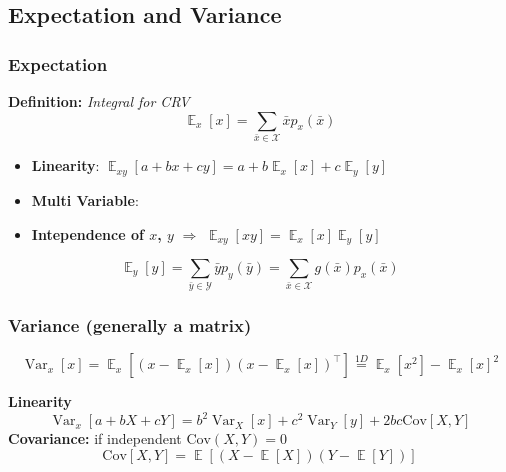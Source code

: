 \subsection{Expectation and Variance}
    \subsubsection{Expectation}
    \textbf{Definition:} \textit{Integral for CRV}
    \begin{equation*}
        \textstyle\mathop{\mathbb{E}}_{x}[x] = \textstyle\sum_{\bar{x} \in \mathcal{X}} \bar{x} p_{x}(\bar{x})
    \end{equation*}
    \begin{itemize}[left=0pt]
        \item \textbf{Linearity}: $\textstyle\mathop{\mathbb{E}}_{xy}[a + bx + cy] = a + b\mathop{\mathbb{E}}_{x}[x] + c\mathop{\mathbb{E}}_{y}[y]$
        \item \textbf{Multi Variable}: 
        \item \textbf{Intependence of $x$, $y$} $\Rightarrow$ $\mathop{\mathbb{E}}_{xy} \left[ xy \right] = \mathop{\mathbb{E}}_{x} \left[ x \right] \mathop{\mathbb{E}}_{y} \left[ y \right]$
    \end{itemize}

    \begin{equation*}
        \textstyle\mathop{\mathbb{E}}_y \left[ y \right]
        = \sum_{\bar{y}\in\mathcal{Y}} \bar{y} p_y (\bar{y})
        = \sum_{\bar{x}\in\mathcal{X}} g(\bar{x})p_x(\bar{x})
    \end{equation*}

    \subsubsection{Variance (generally a matrix)} 
    \begin{equation*}
        \mathop{\mathrm{Var}}_{x}[x] = \mathop{\mathbb{E}}_{x} \left[
        (x \!-\! \textstyle\mathop{\mathbb{E}}_{x}[x])
        (x \!-\! \textstyle\mathop{\mathbb{E}}_{x}[x])^\top\right]
        \overset{1D}{=} \mathop{\mathbb{E}}_{x}\left[ x^2 \right] \!-\! \mathop{\mathbb{E}}_{x}[x]^2
    \end{equation*}

    \textbf{Linearity}
    \begin{equation*}
        \textstyle\mathop{\mathrm{Var}}_{x}[a + bX + cY] = b^2 \mathop{\mathrm{Var}}_{X}[x] + c^2 \mathop{\mathrm{Var}}_{Y}[y] + 2 bc \mathrm{Cov}[X,Y]
    \end{equation*}
    \textbf{Covariance:} if independent $\mathrm{Cov}(X,Y) = 0$
    \begin{equation*}
        \mathrm{Cov}[X,Y] = \mathop{\mathbb{E}}[(X-\mathop{\mathbb{E}}[X])(Y-\mathop{\mathbb{E}}[Y])]
    \end{equation*}